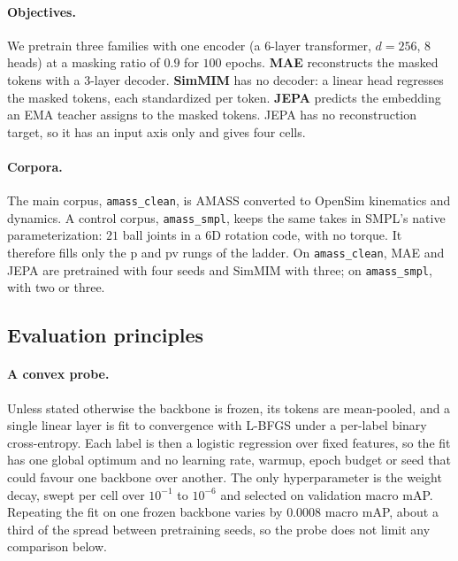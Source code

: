 \paragraph{Objectives.} We pretrain three families with one encoder (a $6$-layer
transformer, $d=256$, $8$ heads) at a masking ratio of $0.9$ for $100$ epochs.
\textbf{MAE} reconstructs the masked tokens with a $3$-layer decoder. \textbf{SimMIM} has no
decoder: a linear head regresses the masked tokens, each standardized per token.
\textbf{JEPA} predicts the embedding an EMA teacher assigns to the masked tokens. JEPA has
no reconstruction target, so it has an input axis only and gives four cells.

\paragraph{Corpora.} The main corpus, \texttt{amass\_clean}, is AMASS converted to OpenSim
kinematics and dynamics. A control corpus, \texttt{amass\_smpl}, keeps the same takes in
SMPL's native parameterization: $21$ ball joints in a 6D rotation code, with no torque. It
therefore fills only the \textsf{p} and \textsf{pv} rungs of the ladder. On
\texttt{amass\_clean}, MAE and JEPA are pretrained with four seeds and SimMIM with three;
on \texttt{amass\_smpl}, with two or three.

\subsection{Evaluation principles}
\label{sec:exp-principles}

\paragraph{A convex probe.} Unless stated otherwise the backbone is frozen, its tokens are
mean-pooled, and a single linear layer is fit to convergence with L-BFGS under a per-label
binary cross-entropy. Each label is then a logistic regression over fixed features, so the
fit has one global optimum and no learning rate, warmup, epoch budget or seed that could
favour one backbone over another. The only hyperparameter is the weight decay, swept per
cell over $10^{-1}$ to $10^{-6}$ and selected on validation macro mAP. Repeating the fit on
one frozen backbone varies by $0.0008$ macro mAP, about a third of the spread between
pretraining seeds, so the probe does not limit any comparison below.

